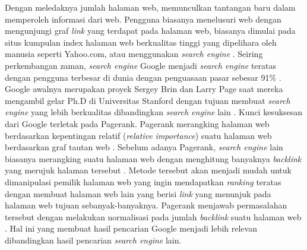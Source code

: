 \documentclass[
	a4paper, %
	12pt, %
	unnumberedsections, %
	twoside, %
]{LTJournalArticle}
\begin{document}
Dengan meledaknya jumlah halaman web, memunculkan tantangan baru dalam memperoleh informasi dari web. Pengguna biasanya menelusuri web dengan mengunjungi graf \textit{link} yang terdapat pada halaman web, biasanya dimulai pada situs kumpulan index halaman web berkualitas tinggi yang dipelihara oleh manusia seperti Yahoo.com, atau menggunakan \textit{search engine} \citep{brin1998anatomy}. Seiring perkembangan zaman, \textit{search engine} Google menjadi \textit{search engine} teratas dengan pengguna terbesar di dunia dengan penguasaan pasar sebesar 91\% \citep{gsc2022marketshare}. Google awalnya merupakan proyek Sergey Brin dan Larry Page saat mereka mengambil gelar Ph.D di Universitas Stanford dengan tujuan membuat \textit{search engine} yang lebih berkualitas dibandingkan \textit{search engine} lain \citep{brin1998anatomy}. Kunci kesuksesan dari Google terletak pada Pagerank. Pagerank merangking halaman web berdasarkan kepentingan relatif (\textit{relative importance}) suatu halaman web berdasarkan graf tautan web \citep{ilprints422}. Sebelum adanya Pagerank, \textit{search engine} lain biasanya merangking suatu halaman web dengan menghitung banyaknya \textit{backlink} yang merujuk halaman tersebut \citep{ilprints422}. Metode tersebut akan menjadi mudah untuk dimanipulasi pemilik halaman web yang ingin mendapatkan \textit{ranking} teratas dengan membuat halaman web lain yang berisi \textit{link} yang menunjuk pada halaman web tujuan sebanyak-banyaknya. Pagerank menjawab permasalahan tersebut dengan melakukan normalisasi pada jumlah \textit{backlink} suatu halaman web \citep{brin1998anatomy}. Hal ini yang membuat hasil pencarian Google menjadi lebih relevan dibandingkan hasil pencarian \textit{search engine} lain.
\end{document}
